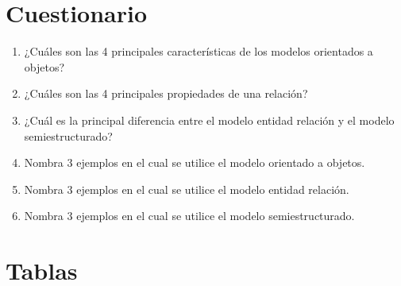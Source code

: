 \documentclass[a4paper,12pt]{article}
\begin{document}
\section*{Cuestionario}

\begin{enumerate}
    \item ¿Cuáles son las 4 principales características de los modelos orientados a objetos?
    \item ¿Cuáles son las 4 principales propiedades de una relación?
    \item ¿Cuál es la principal diferencia entre el modelo entidad relación y el modelo
    semiestructurado?
    \item Nombra 3 ejemplos en el cual se utilice el modelo orientado a objetos.
    \item Nombra 3 ejemplos en el cual se utilice el modelo entidad relación.
    \item Nombra 3 ejemplos en el cual se utilice el modelo semiestructurado.    
\end{enumerate}


\section*{Tablas}
\end{document}
